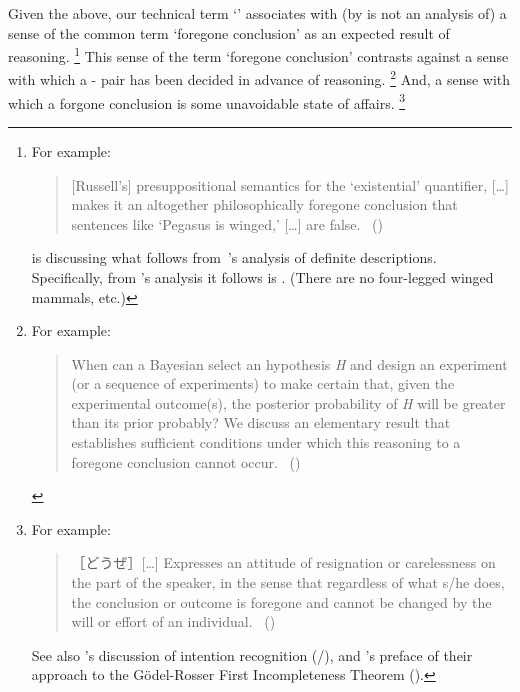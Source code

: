 \begin{note}
  Given the above, our technical term `\fc{}' associates with (by is not an analysis of) a sense of the common term `foregone conclusion' as an expected result of reasoning.%
  \footnote{
    For example:

    \begin{quote}
      [Russell's] presuppositional semantics for the ‘existential' quantifier, [\dots] makes it an altogether philosophically foregone conclusion that sentences like ‘Pegasus is winged,' [\dots] are false.%
      \mbox{ }\hfill\mbox{(\cite[6]{Jacquette:2002up})}
    \end{quote}

    \noindent \citeauthor{Jacquette:2002up} is discussing what follows from~\citeauthor{Russell:1905aa}'s analysis of definite descriptions.
    Specifically, from \citeauthor{Russell:1905aa}'s analysis it follows  is .
    (There are no four-legged winged mammals, etc.)
  }
  This sense of the term `foregone conclusion' contrasts against a sense with which a - pair has been decided in advance of reasoning.%
  \footnote{
    For example:
    \begin{quote}
      When can a Bayesian select an hypothesis \emph{H} and design an experiment (or a sequence of experiments) to make certain that, given the experimental outcome(s), the posterior probability of \emph{H} will be greater than its prior probably?
      We discuss an elementary result that establishes sufficient conditions under which this reasoning to a foregone conclusion cannot occur.%
      \mbox{ }\hfill\mbox{(\cite[1228]{Kadane:1996vu})}
    \end{quote}
  }
  And, a sense with which a forgone conclusion is some unavoidable state of affairs.%
  \footnote{
    For example:
    \begin{quote}
      ［どうぜ］[\dots] Expresses an attitude of resignation or carelessness on the part of the speaker, in the sense that regardless of what s/he does, the conclusion or outcome is foregone and cannot be changed by the will or effort of an individual.%
      \mbox{ }\hfill\mbox{(\cite[332--333]{kurufushamashii:2015un})}
    \end{quote}
    See also \citeauthor{Grice:1957vg}'s discussion of intention recognition (\citeyear[385]{Grice:1957vg}/\citeyear[219]{Grice:1989uf}), and \citeauthor{Machover:1996vu}'s preface of their approach to the G\"{o}del-Rosser First Incompleteness Theorem (\citeyear[viii]{Machover:1996vu}).
  }
\end{note}



